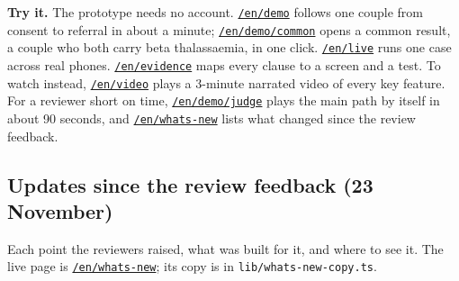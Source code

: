 \documentclass[10.5pt,a4paper]{article}
\newcommand{\code}[1]{\texttt{\small #1}}
\newcommand{\file}[1]{\leavevmode\textcolor{muted}{\texttt{\small #1}}}
\newcommand{\link}[2]{\href{#1}{\color{teal}#2}}
\newcommand{\proto}{https://clara.q7m4v2k9orbit.workers.dev}
\begin{document}
\begin{note}
\textbf{Try it.} The prototype needs no account. \link{\proto/en/demo}{\code{/en/demo}} follows one couple from consent
to referral in about a minute; \link{\proto/en/demo/common}{\code{/en/demo/common}} opens a common result, a couple who both carry beta thalassaemia, in one click. \link{\proto/en/live}{\code{/en/live}} runs one case across real phones.
\link{\proto/en/evidence}{\code{/en/evidence}} maps every clause to a screen and a test. To watch instead, \link{\proto/en/video}{\code{/en/video}} plays a 3-minute narrated video of every key feature.
For a reviewer short on time, \link{\proto/en/demo/judge}{\code{/en/demo/judge}} plays the main path by itself in about
90 seconds, and \link{\proto/en/whats-new}{\code{/en/whats-new}} lists what changed since the review feedback.
\end{note}

\subsection{Updates since the review feedback (23 November)}\label{sec:updates}

Each point the reviewers raised, what was built for it, and where to see it. The live page is
\link{\proto/en/whats-new}{\code{/en/whats-new}}; its copy is in \file{lib/whats-new-copy.ts}.
\end{document}
